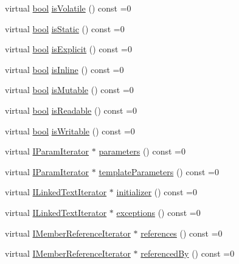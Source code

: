 \begin{DoxyCompactItemize}
\item 
virtual \hyperlink{qglobal_8h_a1062901a7428fdd9c7f180f5e01ea056}{bool} \hyperlink{class_i_member_a3fdbf2abadce789ba6393a7317caeda8}{is\+Volatile} () const  =0
\item 
virtual \hyperlink{qglobal_8h_a1062901a7428fdd9c7f180f5e01ea056}{bool} \hyperlink{class_i_member_aa6d4de8c7e1f4fb5cf8d3ebcd7e85c6e}{is\+Static} () const  =0
\item 
virtual \hyperlink{qglobal_8h_a1062901a7428fdd9c7f180f5e01ea056}{bool} \hyperlink{class_i_member_a7799cb7160c96aab7b8a8df34dbf9b57}{is\+Explicit} () const  =0
\item 
virtual \hyperlink{qglobal_8h_a1062901a7428fdd9c7f180f5e01ea056}{bool} \hyperlink{class_i_member_aab89e9522c1e47abe03100f1c1f69699}{is\+Inline} () const  =0
\item 
virtual \hyperlink{qglobal_8h_a1062901a7428fdd9c7f180f5e01ea056}{bool} \hyperlink{class_i_member_a9847cb09d381efea6eeee60d7011c28c}{is\+Mutable} () const  =0
\item 
virtual \hyperlink{qglobal_8h_a1062901a7428fdd9c7f180f5e01ea056}{bool} \hyperlink{class_i_member_a5ab2224aae08d76a0cf079f75d7d89cc}{is\+Readable} () const  =0
\item 
virtual \hyperlink{qglobal_8h_a1062901a7428fdd9c7f180f5e01ea056}{bool} \hyperlink{class_i_member_af37c7310df3edb8be7f3835763228b83}{is\+Writable} () const  =0
\item 
virtual \hyperlink{class_i_param_iterator}{I\+Param\+Iterator} $\ast$ \hyperlink{class_i_member_a5855dfb76aba6f5646d1246a00f392ee}{parameters} () const  =0
\item 
virtual \hyperlink{class_i_param_iterator}{I\+Param\+Iterator} $\ast$ \hyperlink{class_i_member_a49ae8d3af3060a6e573387a98afeeed8}{template\+Parameters} () const  =0
\item 
virtual \hyperlink{class_i_linked_text_iterator}{I\+Linked\+Text\+Iterator} $\ast$ \hyperlink{class_i_member_a71d431343387fc9ec7b9685404671d65}{initializer} () const  =0
\item 
virtual \hyperlink{class_i_linked_text_iterator}{I\+Linked\+Text\+Iterator} $\ast$ \hyperlink{class_i_member_a48fca8accbb372c3df848581ccd18801}{exceptions} () const  =0
\item 
virtual \hyperlink{class_i_member_reference_iterator}{I\+Member\+Reference\+Iterator} $\ast$ \hyperlink{class_i_member_acd69d288806e7cb63198e2b5f0e948ce}{references} () const  =0
\item 
virtual \hyperlink{class_i_member_reference_iterator}{I\+Member\+Reference\+Iterator} $\ast$ \hyperlink{class_i_member_aac1e5a22695c2c0f4f84252073574abc}{referenced\+By} () const  =0

\end{DoxyCompactItemize}
